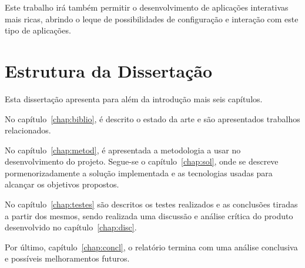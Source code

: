 Este trabalho irá também permitir o desenvolvimento de aplicações interativas mais ricas, abrindo o leque de possibilidades de configuração e interação com este tipo de aplicações. 

\section{Estrutura da Dissertação} \label{sec:struct}

Esta dissertação apresenta para além da introdução mais seis capítulos.

No capítulo~\ref{chap:biblio}, é descrito o estado da arte e são
apresentados trabalhos relacionados. 

No capítulo~\ref{chap:metod}, é apresentada a metodologia a usar no desenvolvimento do projeto. Segue-se o capítulo~\ref{chap:sol}, onde se descreve pormenorizadamente a solução implementada e as tecnologias usadas para alcançar os objetivos propostos.

No capítulo~\ref{chap:testes} são descritos os testes realizados e as conclusões tiradas a partir dos mesmos, sendo realizada uma discussão e análise crítica do produto desenvolvido no capítulo~\ref{chap:disc}.

Por último, capítulo~\ref{chap:concl}, o relatório termina com uma análise conclusiva e possíveis melhoramentos futuros.
